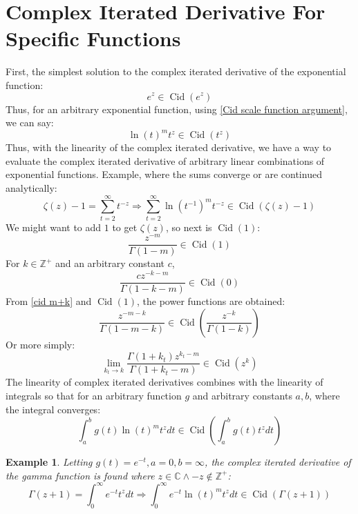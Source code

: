 \documentclass[]{article}
\DeclareMathOperator{\Cid}{Cid}
\newcommand{\pqty}[1]{{\left(#1\right)}}
\newtheorem{example}{Example}[section]
\numberwithin{equation}{section}
\begin{document}
	\section{Complex Iterated Derivative For Specific Functions}
	First, the simplest solution to the complex iterated derivative of the exponential function:
	\begin{equation}
		e^z\in \Cid\pqty{e^z}
	\end{equation}
	Thus, for an arbitrary exponential function, using \eqref{Cid scale function argument}, we can say:
	\begin{equation}
		\ln\pqty{t}^m t^z\in \Cid\pqty{t^z}
	\end{equation}
	Thus, with the linearity of the complex iterated derivative, we have a way to evaluate the complex iterated derivative of arbitrary linear combinations of exponential functions. Example, where the sums converge or are continued analytically:
	\begin{equation}
		\zeta\pqty{z}-1=\sum_{t=2}^{\infty}t^{-z}
		\Rightarrow
		\sum_{t=2}^{\infty}\ln\pqty{t^{-1}}^m t^{-z}\in\Cid\pqty{\zeta\pqty{z}-1}
	\end{equation}
	We might want to add $1$ to get $\zeta\pqty{z}$, so next is $\Cid\pqty{1}$:
	\begin{equation}
		\frac{z^{-m}}{\Gamma\pqty{1-m}}\in\Cid\pqty{1}
	\end{equation}
	For $k\in\mathbb{Z}^+$ and an arbitrary constant $c$,
	\begin{equation}
		\frac{cz^{-k-m}}{\Gamma\pqty{1-k-m}}\in\Cid\pqty{0}
	\end{equation}
	From \eqref{cid m+k} and $\Cid\pqty{1}$, the power functions are obtained:
	\begin{equation}
		\frac{z^{-m-k}}{\Gamma\pqty{1-m-k}}\in\Cid\pqty{\frac{z^{-k}}{\Gamma\pqty{1-k}}}
	\end{equation}
	Or more simply:
	\begin{equation}
		\lim\limits_{k_t\to k} \frac{\Gamma\pqty{1+k_t}z^{k_t-m}}{\Gamma\pqty{1+k_t-m}}\in\Cid\pqty{z^{k}}
	\end{equation}
	The linearity of complex iterated derivatives combines with the linearity of integrals so that for an arbitrary function $g$ and arbitrary constants $a,b$, where the integral converges:
	\begin{equation}
		\int_{a}^{b}g\pqty{t}\ln\pqty{t}^m t^z dt
		\in\Cid\pqty{\int_{a}^{b}g\pqty{t}t^z dt}
	\end{equation}
	
	\begin{example}
		Letting $g\pqty{t}=e^{-t},a=0,b=\infty$, the complex iterated derivative of the gamma function is found where $z\in\mathbb{C}\land -z\not\in\mathbb{Z}^+$:
		\begin{equation}
			\Gamma\pqty{z+1} = \int_{0}^{\infty}e^{-t}t^z dt
			\Rightarrow
			\int_{0}^{\infty}e^{-t}\ln\pqty{t}^m t^z dt\in\Cid\pqty{\Gamma\pqty{z+1}}
		\end{equation}
	\end{example}
	
\end{document}
